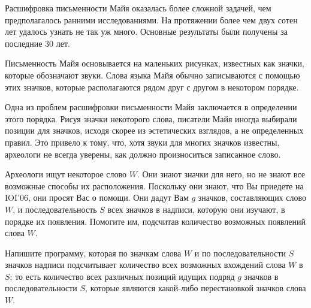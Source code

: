Расшифровка письменности Майя оказалась более сложной задачей, чем предполагалось
ранними исследованиями. На протяжении более чем двух сотен лет удалось узнать не так уж
много. Основные результаты были получены за последние 30 лет.

Письменность Майя основывается на маленьких рисунках, известных как значки, которые
обозначают звуки. Слова языка Майя обычно записываются с помощью этих значков,
которые располагаются рядом друг с другом в некотором порядке.

Одна из проблем расшифровки письменности Майя заключается в определении этого
порядка. Рисуя значки некоторого слова, писатели Майя иногда выбирали позиции для
значков, исходя скорее из эстетических взглядов, а не определенных правил. Это привело к
тому, что, хотя звуки для многих значков известны, археологи не всегда уверены, как должно произноситься записанное слово.

Археологи ищут некоторое слово $W$. Они знают значки для него, но не знают все возможные
способы их расположения. Поскольку они знают, что Вы приедете на IOI'06, они просят Вас о помощи. Они дадут Вам $g$ значков, составляющих слово $W$, и последовательность $S$ всех значков в надписи, которую они изучают, в порядке их появления. Помогите им, подсчитав количество возможных появлений слова $W$.

Напишите программу, которая по значкам слова $W$ и по последовательности $S$ значков
надписи подсчитывает количество всех возможных вхождений слова $W$ в $S$; то есть
количество всех различных позиций идущих подряд $g$ значков в последовательности $S$,
которые являются какой-либо перестановкой значков слова $W$. 